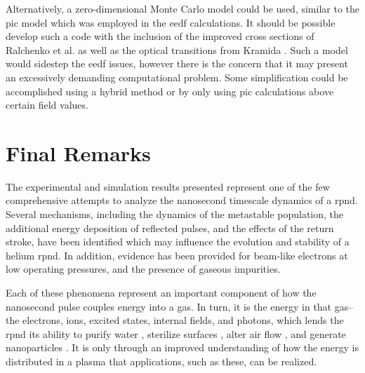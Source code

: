 Alternatively, a zero-dimensional Monte Carlo model could be used, similar to
the \acs{pic} model which was employed in the \acs{eedf} calculations. It should
be possible develop such a code with the inclusion of the improved cross
sections of Ralchenko et al. \cite{Ralchenko2008} as well as the optical
transitions from Kramida \cite{Kramida2012}. Such a model would sidestep the
\acs{eedf} issues, however there is the concern that it may present an
excessively demanding computational problem. Some simplification could be
accomplished using a hybrid method or by only using \acs{pic} calculations above
certain field values.

\section{Final Remarks}

The experimental and simulation results presented represent one of the few
comprehensive attempts to analyze the nanosecond timescale dynamics of a
\acs{rpnd}. Several mechanisms, including the dynamics of the metastable
population, the additional energy deposition of reflected pulses, and the
effects of the return stroke, have been identified which may influence the
evolution and stability of a helium \acs{rpnd}. In addition, evidence has been
provided for beam-like electrons at low operating pressures, and the
presence of gaseous impurities.

Each of these phenomena represent an important component of how the nanosecond
pulse couples energy into a gas. In turn, it is the energy in that gas--the
electrons, ions, excited states, internal fields, and photons, which lends the
\acs{rpnd} its ability to purify water \cite{Malik2001}, sterilize surfaces
\cite{Ayan2009}, alter air flow \cite{Nishihara2007}, and generate nanoparticles
\cite{Ostrikov2011}. It is only through an improved understanding of how the
energy is distributed in a plasma that applications, such as these, can be
realized.
